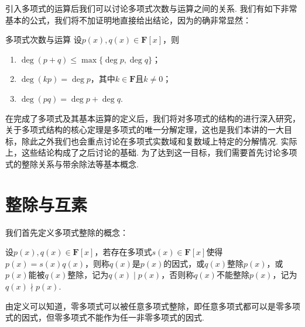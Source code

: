 引入多项式的运算后我们可以讨论多项式次数与运算之间的关系. 我们有如下非常基本的公式，我们将不加证明地直接给出结论，因为的确非常显然：
\begin{theorem}{}{多项式次数与运算}
    设$p(x),q(x)\in\mathbf{F}[x]$，则
    \begin{enumerate}
        \item $\deg(p+q)\leqslant \max\{\deg p,\deg q\}$；
        \item $\deg(kp)=\deg p$，其中$k\in\mathbf{F}$且$k\neq 0$；
        \item $\deg(pq)=\deg p+\deg q$.
    \end{enumerate}
\end{theorem}

在完成了多项式及其基本运算的定义后，我们将对多项式的结构的进行深入研究，关于多项式结构的核心定理是多项式的唯一分解定理，这也是我们本讲的一大目标，除此之外我们也会重点讨论在多项式实数域和复数域上特定的分解情况. 实际上，这些结论构成了之后讨论的基础. 为了达到这一目标，我们需要首先讨论多项式的整除关系与带余除法等基本概念.

\section{整除与互素}
我们首先定义多项式整除的概念：
\begin{definition}{}{}
    设$p(x),q(x)\in\mathbf{F}[x]$，若存在多项式$s(x)\in\mathbf{F}[x]$使得$p(x)=s(x)q(x)$，则称$q(x)$是$p(x)$的因式，或$q(x)$整除$p(x)$，或$p(x)$能被$q(x)$整除，记为$q(x)\mid p(x)$，否则称$q(x)$不能整除$p(x)$，记为$q(x)\nmid p(x)$.
\end{definition}

由定义可以知道，零多项式可以被任意多项式整除，即任意多项式都可以是零多项式的因式，但零多项式不能作为任一非零多项式的因式.

